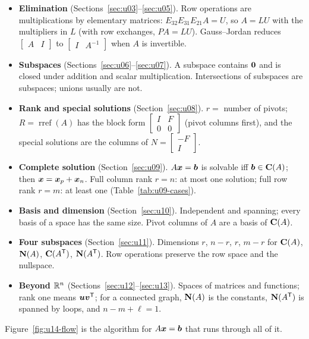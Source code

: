\begin{itemize}
\item \textbf{Elimination} (Sections~\ref{sec:u03}--\ref{sec:u05}). Row operations are
multiplications by elementary matrices: $E_{32}E_{31}E_{21}A=U$, so $A=LU$ with the multipliers in
$L$ (with row exchanges, $PA=LU$). Gauss--Jordan reduces $\begin{bmatrix}A&I\end{bmatrix}$ to
$\begin{bmatrix}I&A^{-1}\end{bmatrix}$ when $A$ is invertible.
\item \textbf{Subspaces} (Sections~\ref{sec:u06}--\ref{sec:u07}). A subspace contains $\boldsymbol{0}$ and
is closed under addition and scalar multiplication. Intersections of subspaces are subspaces;
unions usually are not.
\item \textbf{Rank and special solutions} (Section~\ref{sec:u08}). $r=$ number of pivots;
$R=\operatorname{rref}(A)$ has the block form $\begin{bmatrix}I&F\\0&0\end{bmatrix}$ (pivot columns
first), and the special solutions are the columns of $N=\begin{bmatrix}-F\\I\end{bmatrix}$.
\item \textbf{Complete solution} (Section~\ref{sec:u09}). $A\boldsymbol{x}=\boldsymbol{b}$ is solvable iff
$\boldsymbol{b}\in\mathbf{C}(A)$; then $\boldsymbol{x}=\boldsymbol{x}_p+\boldsymbol{x}_n$. Full column rank $r=n$: at most one solution;
full row rank $r=m$: at least one (Table~\ref{tab:u09-cases}).
\item \textbf{Basis and dimension} (Section~\ref{sec:u10}). Independent and spanning; every basis of
a space has the same size. Pivot columns of $A$ are a basis of $\mathbf{C}(A)$.
\item \textbf{Four subspaces} (Section~\ref{sec:u11}). Dimensions $r$, $n-r$, $r$, $m-r$ for
$\mathbf{C}(A)$, $\mathbf{N}(A)$, $\mathbf{C}(A^{\mathsf{T}})$, $\mathbf{N}(A^{\mathsf{T}})$. Row operations preserve the row space and the
nullspace.
\item \textbf{Beyond $\mathbb{R}^n$} (Sections~\ref{sec:u12}--\ref{sec:u13}). Spaces of matrices and
functions; rank one means $\boldsymbol{u}\boldsymbol{v}^{\mathsf{T}}$; for a connected graph, $\mathbf{N}(A)$ is the constants,
$\mathbf{N}(A^{\mathsf{T}})$ is spanned by loops, and $n-m+\ell=1$.
\end{itemize}

Figure~\ref{fig:u14-flow} is the algorithm for $A\boldsymbol{x}=\boldsymbol{b}$ that runs through all of it.

